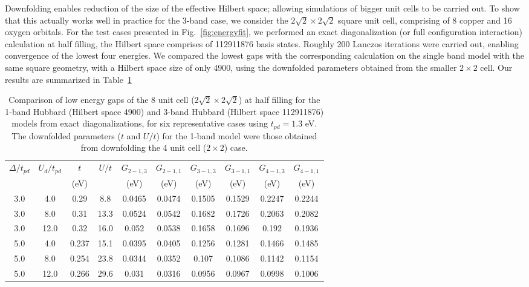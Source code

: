 Downfolding enables reduction of the size of the effective Hilbert space; allowing 
simulations of bigger unit cells to be carried out. To show that this actually works well in practice for the 3-band case, 
we consider the $2\sqrt{2} \times 2 \sqrt{2}$ square unit cell, comprising of 8 copper and 16 oxygen orbitals. 
For the test cases presented in Fig.~\ref{fig:energyfit}, we performed an exact diagonalization 
(or full configuration interaction) calculation at half filling, the Hilbert space comprises of 112911876 basis states. 
Roughly 200 Lanczos iterations were carried out, enabling convergence of the lowest four energies. 
We compared the lowest gaps with the corresponding calculation on the single 
band model with the same square geometry, with a Hilbert space size of only 4900, 
using the downfolded parameters obtained from the smaller $2 \times 2$ cell. Our results are summarized 
in Table~\ref{tab:predictivity}

\begin{table}[ht]
\centering
\begin{tabular}{c|c|c|c||c|c||c|c||c|c}
\hline
$\Delta/t_{pd}$ & $U_d/t_{pd}$ & $t$ & $U/t$ & $G_{2-1,3}$ & $G_{2-1,1}$ & $G_{3-1,3}$ & $G_{3-1,1}$ & $G_{4-1,3}$ & $G_{4-1,1}$  \\
                &              & (eV)&       & (eV)        & (eV)        & (eV)        & (eV)        & (eV)        & (eV)         \\
\hline
\hline
3.0 & 4.0 & 0.29 & 8.8 & 0.0465 & 0.0474 & 0.1505 & 0.1529 & 0.2247 & 0.2244  \\ 
3.0 & 8.0 & 0.31 & 13.3 & 0.0524 & 0.0542 & 0.1682 & 0.1726 & 0.2063 & 0.2082  \\ 
3.0 & 12.0 & 0.32 & 16.0 & 0.052 & 0.0538 & 0.1658 & 0.1696 & 0.192 & 0.1936  \\ 
5.0 & 4.0 & 0.237 & 15.1 & 0.0395 & 0.0405 & 0.1256 & 0.1281 & 0.1466 & 0.1485  \\ 
5.0 & 8.0 & 0.254 & 23.8 & 0.0344 & 0.0352 & 0.107 & 0.1086 & 0.1142 & 0.1154  \\ 
5.0 & 12.0 & 0.266 & 29.6 & 0.031 & 0.0316 & 0.0956 & 0.0967 & 0.0998 & 0.1006  \\ 
\hline
\end{tabular}
\caption{Comparison of low energy gaps of the 8 unit cell ($2\sqrt{2} \times 2\sqrt{2}$) at half filling for the 
1-band Hubbard (Hilbert space 4900) and 3-band Hubbard (Hilbert space 112911876) 
models from exact diagonalizations, for six representative cases using $t_{pd}=1.3 $ eV. The downfolded parameters ($t$ and $U/t$) 
for the 1-band model were those obtained from downfolding the 4 unit cell ($2\times2$) case.}
\label{tab:predictivity}
\end{table} 



